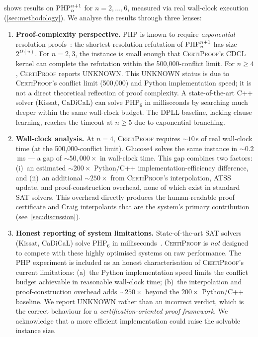 \documentclass[acmtocl,review,anonymous]{acmart}
\newcommand{\CP}{\textsc{CertiProof}}
\newcommand{\PHP}{\textnormal{PHP}}
\begin{document}
 shows results on $\PHP_n^{n+1}$ for
$n = 2, \ldots, 6$, measured via real wall-clock execution
(\cref{sec:methodology}).  We analyse the results through three
lenses:

\begin{enumerate}
  \item \textbf{Proof-complexity perspective.}  PHP is known to require
    \emph{exponential} resolution
    proofs~\cite{Pitassi1998,Ben-Sasson2001}: the shortest
    resolution refutation of $\PHP_n^{n+1}$ has size
    $2^{\Omega(n)}$.  For $n=2,3$, the instance is small enough
    that \CP{}'s CDCL kernel can complete the refutation within the
    500{,}000-conflict limit.  For $n \geq 4$, \CP{} reports UNKNOWN.
    This UNKNOWN status is due to \CP{}'s conflict limit (500{,}000)
    and Python implementation speed; it is not a direct theoretical
    reflection of proof complexity.
    A state-of-the-art C++ solver (Kissat, CaDiCaL) can solve
    PHP$_6$ in milliseconds by searching much deeper within the same
    wall-clock budget.  The DPLL baseline, lacking clause learning,
    reaches the timeout at $n \geq 5$ due to exponential branching.

  \item \textbf{Wall-clock analysis.}  At $n=4$, \CP{} requires
    ${\sim}10$\,s of real wall-clock time (at the 500{,}000-conflict limit).
    Glucose4 solves the same instance in ${\sim}0.2$\,ms --- a
    gap of ${\sim}50{,}000\times$ in wall-clock time.  This gap
    combines two factors: (i)~an estimated ${\sim}200\times$ Python/C++
    implementation-efficiency difference, and (ii)~an additional
    ${\sim}250\times$ from \CP{}'s interpolation, ATSS update, and
    proof-construction overhead, none of which exist in standard SAT
    solvers.  This overhead directly produces the human-readable
    proof certificate and Craig interpolants that are the system's
    primary contribution
    (see~\cref{sec:discussion}).

  \item \textbf{Honest reporting of system limitations.}
    State-of-the-art SAT solvers (Kissat, CaDiCaL) solve PHP$_6$ in
    milliseconds~\cite{BiereSATCompetition2024}.  \CP{} is \emph{not}
    designed to compete with these highly optimised systems on raw
    performance.  The PHP experiment is included as an honest
    characterisation of \CP{}'s current limitations: (a)~the Python
    implementation speed limits the conflict budget achievable in
    reasonable wall-clock time; (b)~the interpolation and
    proof-construction overhead adds ${\sim}250\times$ beyond the
    $200\times$ Python/C++ baseline.  We report UNKNOWN rather than
    an incorrect verdict, which is the correct behaviour for a
    \emph{certification-oriented proof framework}.  We acknowledge that a more
    efficient implementation could raise the solvable instance size.
\end{enumerate}
\end{document}
